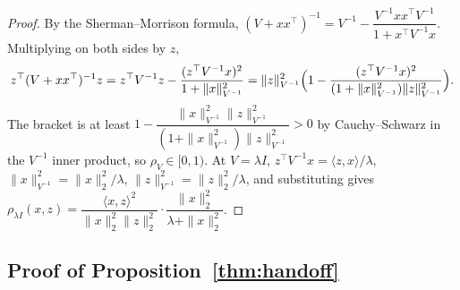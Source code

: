 \documentclass[anon]{alt2027} %
\begin{document}
\begin{proof}
By the Sherman--Morrison formula,
$(V+xx^\top)^{-1}=V^{-1}-\dfrac{V^{-1}xx^\top V^{-1}}{1+x^\top V^{-1}x}$. Multiplying
on both sides by $z$,
\[
z^\top(V+xx^\top)^{-1}z
= z^\top V^{-1}z-\frac{(z^\top V^{-1}x)^2}{1+\|x\|^2_{V^{-1}}}
=\|z\|^2_{V^{-1}}\Bigl(1-\frac{(z^\top V^{-1}x)^2}{(1+\|x\|^2_{V^{-1}})\|z\|^2_{V^{-1}}}\Bigr).
\]
The bracket is at least $1-\dfrac{\|x\|^2_{V^{-1}}\|z\|^2_{V^{-1}}}{(1+\|x\|^2_{V^{-1}})\|z\|^2_{V^{-1}}}>0$
by Cauchy--Schwarz in the $V^{-1}$ inner product, so $\rho_V\in[0,1)$. At
$V=\lambda I$, $z^\top V^{-1}x=\langle z,x\rangle/\lambda$,
$\|x\|^2_{V^{-1}}=\|x\|_2^2/\lambda$, $\|z\|^2_{V^{-1}}=\|z\|_2^2/\lambda$, and
substituting gives
$\rho_{\lambda I}(x,z)=\dfrac{\langle x,z\rangle^2}{\|x\|_2^2\|z\|_2^2}\cdot\dfrac{\|x\|_2^2}{\lambda+\|x\|_2^2}$.
\end{proof}

\subsection{Proof of Proposition~\ref{thm:handoff}}
\label{app:proof-handoff}
\end{document}
